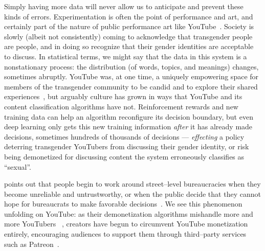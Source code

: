 \documentclass[main]{subfiles}
\begin{document}
Simply having more data will never allow us to anticipate and prevent these kinds of errors.
Experimentation is often the point of performance and art, and
certainly part of the nature of public performance art like YouTube~\cite{cohen1998radical,mason1992street}.
Society is slowly (albeit not consistently) coming to acknowledge that transgender people are people,
and in doing so recognize that their gender identities are acceptable to discuss.
In statistical terms, we might say that
the data in this system is a nonstationary process:
the distribution (of words, topics, and meanings) changes, sometimes abruptly.
YouTube was, at one time, a uniquely empowering space for members of the transgender community
to be candid and to explore their shared experiences~\cite{ONeill2014,raun2016out}, but
arguably culture has grown in ways that YouTube and its content classification algorithms have not.
Reinforcement rewards and new training data can help an algorithm reconfigure its decision boundary, but
even deep learning only gets this new training information \textit{after}
it has already made decisions, sometimes hundreds of thousands of decisions
--- \textit{effecting} a policy deterring transgender YouTubers from discussing their gender identity,
or risk being demonetized for discussing content the system erroneously classifies as ``sexual''.

\citeauthor{lipsky1983street} points out that
people begin to work around street--level bureaucracies when they become unreliable and untrustworthy, or
when the public decide that they cannot hope for bureaucrats to make favorable decisions~\cite{lipsky1983street}.
We see this phenomenon unfolding on YouTube:
as their demonetization algorithms mishandle more and more YouTubers ~\cite{adpocalypseForbes,summers2018professors},
creators have begun to circumvent YouTube monetization entirely,
encouraging audiences to support them through third--party services such as Patreon~\cite{leppanen2017state}.


\onlyinsubfile{
  
  
}
\end{document}
